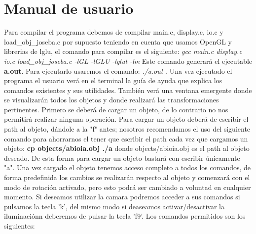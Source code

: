 \documentclass[12pt,a4paper]{article}
\begin{document}
\section{Manual de usuario}

Para compilar el programa debemos de compilar main.c, display.c, io.c y load\_obj\_joseba.c por supuesto teniendo en cuenta que usamos OpenGL y librerias de lglu, el comando para compilar es el siguiente:\newline
\textit{gcc main.c  display.c io.c load\_obj\_joseba.c -lGL -lGLU -lglut -lm}\newline
Este comando generará el ejecutable \textbf{a.out}. Para ejecutarlo usaremos el comando: \textit{ ./a.out }. Una vez ejecutado el programa el usuario verá en el terminal la guía de ayuda que explica los comandos existentes y sus utilidades. También verá una ventana emergente donde se visualizarán todos los objetos y donde realizará las transformaciones pertinentes. \newline
Primero se deberá de cargar un objeto, de lo contrario no nos permitirá realizar ninguna operación. Para cargar un objeto deberá de escribir el path al objeto, dándole a la "f" antes; nosotros recomendamos el uso del siguiente comando para ahorrarnos el tener que escribir el path cada vez que cargamos un objeto: \textbf{cp objects/abioia.obj ./a} donde objects/abioia.obj es el path al objeto deseado. De esta forma para cargar un objeto bastará con escribir únicamente "a".\newline
Una vez cargado el objeto tenemos acceso completo a todos los comandos, de forma predefinida los cambios se realizarán respecto al objeto y comenzará con el modo de rotación activado, pero esto podrá ser cambiado a voluntad en cualquier momento. Si deseamos utilizar la camara podremos acceder a sus comandos si pulsamos la tecla 'k', del mismo modo si deaseamos activar/desactivar la iluminaciónn deberemos de pulsar la tecla 'f9'.\newline
Los comandos permitidos son los siguientes:
\end{document}
